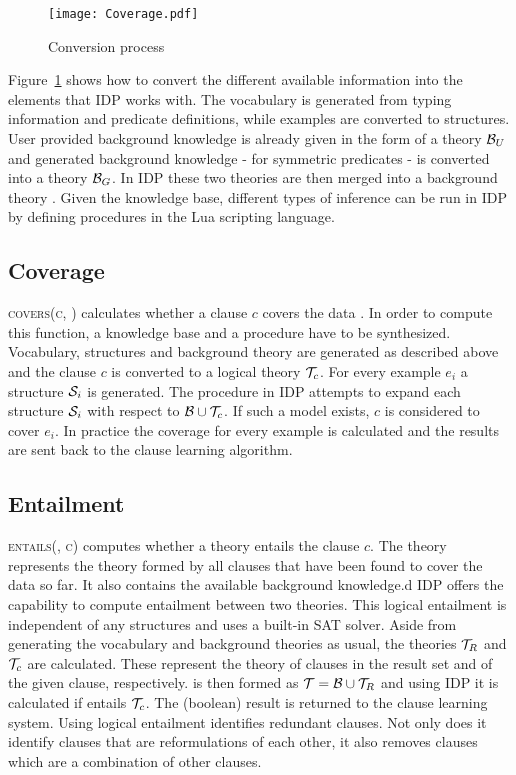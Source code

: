 \begin{figure}

	\caption{Conversion process}
	\centering
		\texttt{[image: Coverage.pdf]}
	\label{fig:conversion_to_logic}

\end{figure}

Figure~\ref{fig:conversion_to_logic} shows how to convert the different available information into the elements that IDP works with.
The vocabulary is generated from typing information and predicate definitions, while examples are converted to structures.
User provided background knowledge is already given in the form of a theory $\mathcal{B}_U$ and generated background knowledge - for symmetric predicates - is converted into a theory $\mathcal{B}_G$.
In IDP these two theories are then merged into a background theory .
Given the knowledge base, different types of inference can be run in IDP by defining procedures in the Lua scripting language.

\subsection{Coverage}
\textsc{covers(c, )} calculates whether a clause $c$ covers the data .
In order to compute this function, a knowledge base and a procedure have to be synthesized.
Vocabulary, structures and background theory are generated as described above and the clause $c$ is converted to a logical theory $\mathcal{T}_c$.
For every example $e_i$ a structure $\mathcal{S}_i$ is generated.
The procedure in IDP attempts to expand each structure $\mathcal{S}_i$ with respect to $\mathcal{B} \cup \mathcal{T}_c$.
If such a model exists, $c$ is considered to cover $e_i$.
In practice the coverage for every example is calculated and the results are sent back to the clause learning algorithm.

\subsection{Entailment}
\textsc{entails(, c)} computes whether a theory  entails the clause $c$.
The theory  represents the theory formed by all clauses that have been found to cover the data so far.
It also contains the available background knowledge.d
IDP offers the capability to compute entailment between two theories.
This logical entailment is independent of any structures and uses a built-in SAT solver.
Aside from generating the vocabulary and background theories as usual, the theories $\mathcal{T}_R$ and $\mathcal{T}_c$ are calculated.
These represent the theory of clauses in the result set and of the given clause, respectively.
 is then formed as $\mathcal{T} = \mathcal{B} \cup \mathcal{T}_R$ and using IDP it is calculated if  entails $\mathcal{T}_c$.
The (boolean) result is returned to the clause learning system.
Using logical entailment identifies redundant clauses.
Not only does it identify clauses that are reformulations of each other, it also removes clauses which are a combination of other clauses.

